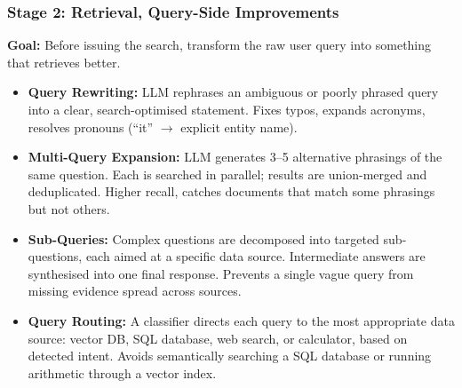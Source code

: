 \begin{frame}[fragile]\frametitle{Stage 2: Retrieval, Query-Side Improvements}

\textbf{Goal:} Before issuing the search, transform the raw user query into something that retrieves better.

\begin{itemize}
  \item \textbf{Query Rewriting:}
    LLM rephrases an ambiguous or poorly phrased query into a clear, search-optimised statement. Fixes typos, expands acronyms, resolves pronouns (``it'' $\rightarrow$ explicit entity name).

  \item \textbf{Multi-Query Expansion:}
    LLM generates 3--5 alternative phrasings of the same question. Each is searched in parallel; results are union-merged and deduplicated. Higher recall, catches documents that match some phrasings but not others.

  \item \textbf{Sub-Queries:}
    Complex questions are decomposed into targeted sub-questions, each aimed at a specific data source. Intermediate answers are synthesised into one final response. Prevents a single vague query from missing evidence spread across sources.

  \item \textbf{Query Routing:}
    A classifier directs each query to the most appropriate data source: vector DB, SQL database, web search, or calculator, based on detected intent. Avoids semantically searching a SQL database or running arithmetic through a vector index.
\end{itemize}

\end{frame}


